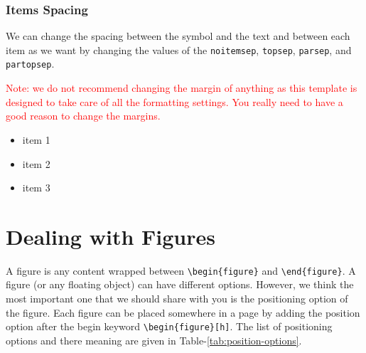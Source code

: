 \subsubsection{Items Spacing}

We can change the spacing between the symbol and the text and between each item as we want by changing the values of the \verb|noitemsep|, \verb|topsep|, \verb|parsep|, and \verb|partopsep|. 

\textcolor{red}{Note: we do not recommend changing the margin of anything as this template is designed to take care of all the formatting settings. You really need to have a good reason to change the margins.}

\begin{itemize}[noitemsep,topsep=10pt,parsep=10pt,partopsep=10pt]
\item item 1
\item item 2
\item item 3
\end{itemize}


\section{Dealing with Figures}
\label{sec:dealing_with_figures}

A figure is any content wrapped between \verb|\begin{figure}| and \verb|\end{figure}|. A figure (or any floating object) can have different options. However, we think the most important one that we should share with you is the positioning option of the figure. Each figure can be placed somewhere in a page by adding the position option after the begin keyword \verb|\begin{figure}[h]|. The list of positioning options and there meaning are given in Table-\ref{tab:position-options}.

